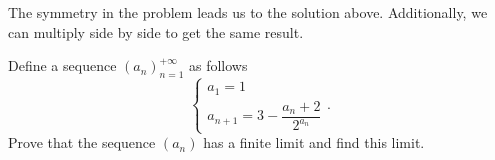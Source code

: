 \documentclass[11pt]{article}
\begin{document}
        \begin{remark}
            The symmetry in the problem leads us to the solution above. Additionally, we can multiply side by side to get the same result.
        \end{remark}

        \newpage

        \begin{problem}
            Define a sequence \((a_n)_{n=1}^{+\infty}\) as follows
            \[\begin{cases}
                a_1 = 1 \\
                a_{n+1} = 3 - \dfrac{a_n + 2}{2^{a_n}} 
            \end{cases}.\]
            Prove that the sequence \((a_n)\) has a finite limit and find this limit.
        \end{problem}
\end{document}

